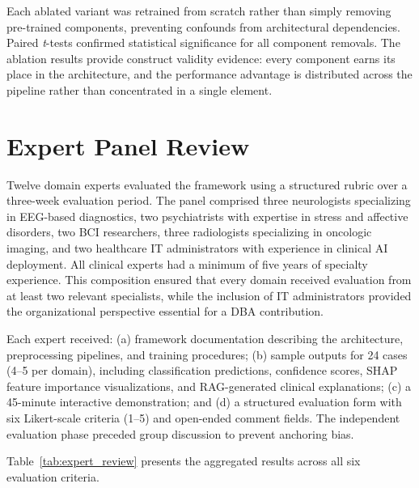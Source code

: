 Each ablated variant was retrained from scratch rather than simply removing pre-trained components, preventing confounds from architectural dependencies. Paired \textit{t}-tests confirmed statistical significance for all component removals. The ablation results provide construct validity evidence: every component earns its place in the architecture, and the performance advantage is distributed across the pipeline rather than concentrated in a single element.


\section{Expert Panel Review}
\label{sec:expert_panel}

Twelve domain experts evaluated the framework using a structured rubric over a three-week evaluation period. The panel comprised three neurologists specializing in EEG-based diagnostics, two psychiatrists with expertise in stress and affective disorders, two BCI researchers, three radiologists specializing in oncologic imaging, and two healthcare IT administrators with experience in clinical AI deployment. All clinical experts had a minimum of five years of specialty experience. This composition ensured that every domain received evaluation from at least two relevant specialists, while the inclusion of IT administrators provided the organizational perspective essential for a DBA contribution.

Each expert received: (a) framework documentation describing the architecture, preprocessing pipelines, and training procedures; (b) sample outputs for 24 cases (4--5 per domain), including classification predictions, confidence scores, SHAP feature importance visualizations, and RAG-generated clinical explanations; (c) a 45-minute interactive demonstration; and (d) a structured evaluation form with six Likert-scale criteria (1--5) and open-ended comment fields. The independent evaluation phase preceded group discussion to prevent anchoring bias.

Table~\ref{tab:expert_review} presents the aggregated results across all six evaluation criteria.


